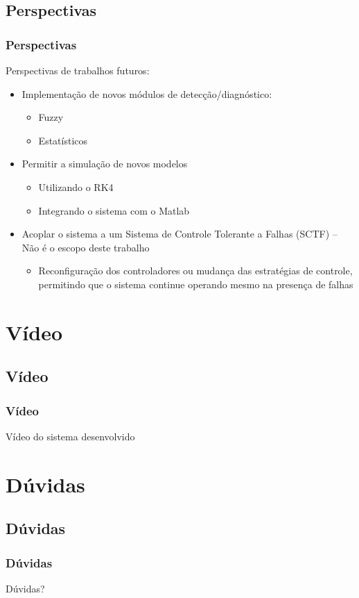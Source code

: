 \documentclass{beamer}
\begin{document}
\subsection{Perspectivas}
\begin{frame}
    \frametitle{Perspectivas}

    Perspectivas de trabalhos futuros:

\begin{itemize}
    \item Implementação de novos módulos de detecção/diagnóstico:
    \begin{itemize}
        \item Fuzzy
        \item Estatísticos
    \end{itemize}
    \item Permitir a simulação de novos modelos
    \begin{itemize}
        \item Utilizando o RK4
        \item Integrando o sistema com o Matlab\reg
    \end{itemize}
    \item Acoplar o sistema a um Sistema de Controle Tolerante a Falhas (SCTF)
          -- Não é o escopo deste trabalho
    \begin{itemize}
        \item Reconfiguração dos controladores ou mudança das estratégias de
              controle, permitindo que o sistema continue operando mesmo na
              presença de falhas
    \end{itemize}
\end{itemize}

\end{frame}

\section{Vídeo}
\subsection*{Vídeo}
\begin{frame}
    \frametitle{Vídeo}

    \Large Vídeo do sistema desenvolvido
\end{frame}

\section*{Dúvidas}
\subsection*{Dúvidas}
\begin{frame}
    \frametitle{Dúvidas}

    \Large Dúvidas?
\end{frame}
\end{document}
